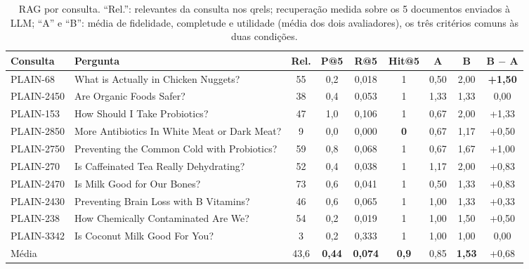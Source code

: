 \documentclass[10pt,a4paper]{article}
\newcommand{\pq}[1]{\mbox{PLAIN-#1}}        %
\begin{document}
\begin{table}[!htb]
\centering\small
\caption{RAG por consulta. ``Rel.'': relevantes da consulta nos qrels; recuperação medida sobre os 5 documentos enviados à LLM; ``A'' e ``B'': média de fidelidade, completude e utilidade (média dos dois avaliadores), os três critérios comuns às duas condições.}
\label{tab:ragq}
\setlength{\tabcolsep}{5pt}
\begin{tabular}{@{}llccccccc@{}}
\toprule
Consulta & Pergunta & Rel. & P@5 & R@5 & Hit@5 & A & B & B $-$ A \\
\midrule
\pq{68}   & What is Actually in Chicken Nuggets?          & 55 & 0,2 & 0,018 & 1 & 0,50 & 2,00 & \textbf{+1,50} \\
\pq{2450} & Are Organic Foods Safer?                      & 38 & 0,4 & 0,053 & 1 & 1,33 & 1,33 & 0,00 \\
\pq{153}  & How Should I Take Probiotics?                 & 47 & 1,0 & 0,106 & 1 & 0,67 & 2,00 & +1,33 \\
\pq{2850} & More Antibiotics In White Meat or Dark Meat?  &  9 & 0,0 & 0,000 & \textbf{0} & 0,67 & 1,17 & +0,50 \\
\pq{2750} & Preventing the Common Cold with Probiotics?   & 59 & 0,8 & 0,068 & 1 & 0,67 & 1,67 & +1,00 \\
\pq{270}  & Is Caffeinated Tea Really Dehydrating?        & 52 & 0,4 & 0,038 & 1 & 1,17 & 2,00 & +0,83 \\
\pq{2470} & Is Milk Good for Our Bones?                   & 73 & 0,6 & 0,041 & 1 & 0,50 & 1,33 & +0,83 \\
\pq{2430} & Preventing Brain Loss with B Vitamins?        & 46 & 0,6 & 0,065 & 1 & 1,00 & 1,33 & +0,33 \\
\pq{238}  & How Chemically Contaminated Are We?           & 54 & 0,2 & 0,019 & 1 & 1,00 & 1,50 & +0,50 \\
\pq{3342} & Is Coconut Milk Good For You?                 &  3 & 0,2 & 0,333 & 1 & 1,00 & 1,00 & 0,00 \\
\midrule
Média & & 43,6 & \textbf{0,44} & \textbf{0,074} & \textbf{0,9} & 0,85 & \textbf{1,53} & +0,68 \\
\bottomrule
\end{tabular}
\end{table}
\end{document}
